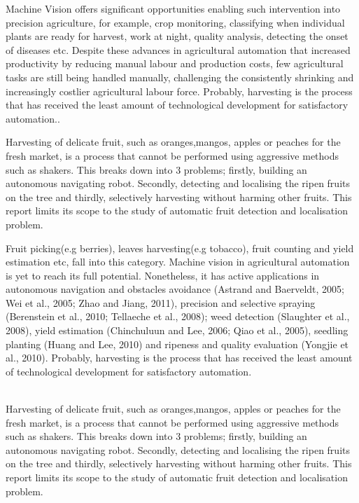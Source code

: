 \documentclass[12pt]{article}
\begin{document}
Machine Vision offers significant opportunities enabling such intervention into precision agriculture, for example, crop monitoring, classifying when individual plants are ready for harvest\cite{article_Barnes}, work at night, quality analysis, detecting the onset of diseases etc. 
Despite these advances in agricultural automation that increased productivity by reducing manual labour and production costs, few agricultural tasks are still being handled manually, challenging the consistently shrinking and increasingly costlier agricultural labour force\cite{Kapach2012ComputerVF}. Probably, harvesting is the process that has received the least amount of technological development for satisfactory automation.\cite{article}.

Harvesting of delicate fruit, such as oranges,mangos, apples or peaches for the fresh market, is a process that cannot be performed using
aggressive methods such as shakers. This breaks down into 3 problems; firstly, building an autonomous navigating robot. Secondly, detecting and localising the ripen fruits on the tree and thirdly, selectively harvesting without harming other fruits. This report limits its scope to the study of automatic fruit detection and localisation problem.



Fruit picking(e.g berries), leaves harvesting(e.g tobacco), fruit counting and yield estimation etc, fall into this category. 
Machine vision in agricultural automation is yet to reach its full potential. Nonetheless, it has active applications in autonomous navigation and obstacles
avoidance (Astrand and Baerveldt, 2005; Wei et al., 2005; Zhao and Jiang, 2011),
precision and selective spraying (Berenstein et al., 2010; Tellaeche et al., 2008);
weed detection (Slaughter et al., 2008), yield estimation (Chinchuluun and Lee, 2006;
Qiao et al., 2005), seedling planting (Huang and Lee, 2010) and ripeness and quality
evaluation (Yongjie et al., 2010). Probably, harvesting is the process that
has received the least amount of technological development for satisfactory automation.\cite{article}

\\Harvesting of delicate fruit, such as oranges,mangos, apples or peaches for the fresh market, is a process that cannot be performed using
aggressive methods such as shakers. This breaks down into 3 problems; firstly, building an autonomous navigating robot. Secondly, detecting and localising the ripen fruits on the tree and thirdly, selectively harvesting without harming other fruits. This report limits its scope to the study of automatic fruit detection and localisation problem.
\end{document}
